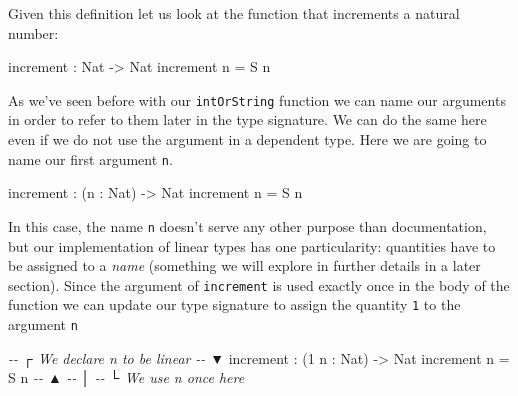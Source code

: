 \documentclass[
]{article}
\newenvironment{Shaded}{}{}
\newcommand{\CommentTok}[1]{\textcolor[rgb]{0.38,0.63,0.69}{\textit{#1}}}
\newcommand{\DataTypeTok}[1]{\textcolor[rgb]{0.56,0.13,0.00}{#1}}
\newcommand{\DecValTok}[1]{\textcolor[rgb]{0.25,0.63,0.44}{#1}}
\newcommand{\NormalTok}[1]{#1}
\newcommand{\OperatorTok}[1]{\textcolor[rgb]{0.40,0.40,0.40}{#1}}
\newcommand{\OtherTok}[1]{\textcolor[rgb]{0.00,0.44,0.13}{#1}}
\begin{document}
Given this definition let us look at the function that increments a
natural number:

\begin{Shaded}
\begin{Highlighting}[]
\NormalTok{increment }\OperatorTok{:} \DataTypeTok{Nat} \OtherTok{{-}\textgreater{}} \DataTypeTok{Nat}
\NormalTok{increment n }\OtherTok{=} \DataTypeTok{S}\NormalTok{ n}
\end{Highlighting}
\end{Shaded}

As we've seen before with our \texttt{intOrString} function we can name
our arguments in order to refer to them later in the type signature. We
can do the same here even if we do not use the argument in a dependent
type. Here we are going to name our first argument \texttt{n}.

\begin{Shaded}
\begin{Highlighting}[]
\NormalTok{increment }\OperatorTok{:}\NormalTok{ (n }\OperatorTok{:} \DataTypeTok{Nat}\NormalTok{) }\OtherTok{{-}\textgreater{}} \DataTypeTok{Nat}
\NormalTok{increment n }\OtherTok{=} \DataTypeTok{S}\NormalTok{ n}
\end{Highlighting}
\end{Shaded}

In this case, the name \texttt{n} doesn't serve any other purpose than
documentation, but our implementation of linear types has one
particularity: quantities have to be assigned to a \emph{name}
(something we will explore in further details in a later section). Since
the argument of \texttt{increment} is used exactly once in the body of
the function we can update our type signature to assign the quantity
\texttt{1} to the argument \texttt{n}

\begin{Shaded}
\begin{Highlighting}[]
\CommentTok{{-}{-}           ┌ We declare \textasciigrave{}n\textasciigrave{} to be linear}
\CommentTok{{-}{-}           ▼}
\NormalTok{increment }\OperatorTok{:}\NormalTok{ (}\DecValTok{1}\NormalTok{ n }\OperatorTok{:} \DataTypeTok{Nat}\NormalTok{) }\OtherTok{{-}\textgreater{}} \DataTypeTok{Nat}
\NormalTok{increment n }\OtherTok{=} \DataTypeTok{S}\NormalTok{ n}
\CommentTok{{-}{-}              ▲}
\CommentTok{{-}{-}              │}
\CommentTok{{-}{-}              └ We use n once here}
\end{Highlighting}
\end{Shaded}
\end{document}
